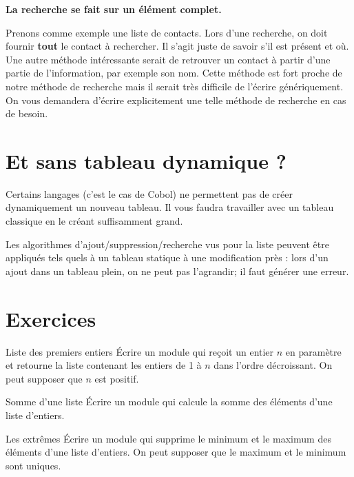 \bigskip

\textbf{La recherche se fait sur un élément complet.}

Prenons comme exemple une liste de contacts.
Lors d'une recherche, on doit fournir
\textbf{tout} le contact à
rechercher. Il s'agit juste de savoir
s'il est présent et où. Une autre méthode intéressante
serait de retrouver un contact à partir d'une partie
de l'information, par exemple son nom. Cette méthode
est fort proche de notre méthode de recherche mais il serait très
difficile de l'écrire génériquement. On vous demandera
d'écrire explicitement une telle méthode de recherche
en cas de besoin.


\section{Et sans tableau dynamique ?}

Certains langages (c’est le cas de Cobol) ne permettent pas de créer
dynamiquement un nouveau tableau. Il vous faudra travailler avec un
tableau classique en le créant suffisamment grand.


Les algorithmes d’ajout/suppression/recherche vus pour la liste peuvent
être appliqués tels quels à un tableau statique à une modification près
: lors d’un ajout dans un tableau plein, on ne peut pas l’agrandir; il
faut générer une erreur.


\section{Exercices}

\begin{Exercice}{Liste des premiers entiers}
	Écrire un module qui reçoit un entier $n$ en paramètre et retourne la
	liste contenant les entiers de 1 à $n$ dans l'ordre
	décroissant. On peut supposer que $n$ est positif.
\end{Exercice}
	
\begin{Exercice}{Somme d'une liste}
	Écrire un module qui calcule la somme des éléments d’une liste
	d’entiers.
\end{Exercice}

\begin{Exercice}{Les extrêmes}
		Écrire un module qui supprime le minimum et le maximum des éléments
		d’une liste d’entiers. On peut supposer que le maximum et le minimum
		sont uniques.
\end{Exercice}

